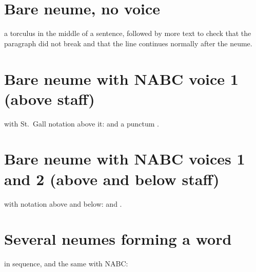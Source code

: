 \documentclass[11pt]{article}
\begin{document}
\section*{Bare neume, no voice}
\noindent a torculus  in the middle of a
sentence, followed by more text to check that the paragraph did not break
and that the line continues normally after the neume.

\bigskip
\section*{Bare neume with NABC voice 1 (above staff)}
\noindent with St.\ Gall notation above it:
 and a punctum .

\bigskip
\section*{Bare neume with NABC voices 1 and 2 (above and below staff)}
\noindent with notation above and below:
 and .

\bigskip
\section*{Several neumes forming a word}
\noindent
{}
in sequence, and the same with NABC:
\end{document}
